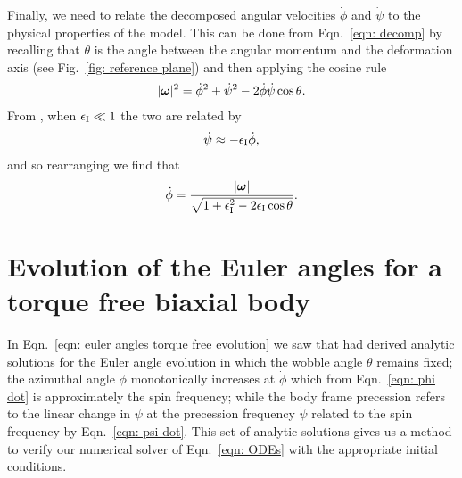 \documentclass[../full_thesis/full_thesis.tex]{subfiles}
\begin{document}
Finally, we need to relate the decomposed angular
velocities $\dot{\phi}$ and $\dot{\psi}$ to the physical properties of the
model.  This can be done from Eqn.~\eqref{eqn: decomp} by recalling that
$\theta$ is the angle between the angular momentum and the deformation axis
(see Fig.~\ref{fig: reference plane}) and then applying the cosine rule
\begin{align}
|\boldsymbol{\omega}|^{2} = \dot{\phi}^{2}+\dot{\psi}^{2} - 2\dot{\phi}\dot{\psi}\cos\theta.
\end{align}
From \citet{Jones2001}, when $\epsilon_{\mathrm{I}} \ll 1$ the two are related by
\begin{align}
\dot{\psi} \approx - \epsilon_{\mathrm{I}} \dot{\phi},
\label{eqn: psi dot}
\end{align}
and so rearranging we find that
\begin{align}
\dot{\phi} = \frac{|\boldsymbol{\omega}|}{\sqrt{1+\epsilon_{\mathrm{I}}^{2} - 2\epsilon_{\mathrm{I}}\cos\theta}}.
\label{eqn: phi dot}
\end{align}

\section{Evolution of the Euler angles for a torque free biaxial body}
\label{sec: biaxial body with no torque}

In Eqn.~\eqref{eqn: euler angles torque free evolution} we saw that
\citet{Jones2001} had derived analytic solutions for the Euler angle evolution
in which the wobble angle $\theta$ remains fixed; the azimuthal angle $\phi$
monotonically increases at $\dot{\phi}$ which from Eqn.~\eqref{eqn: phi dot} is
approximately the spin frequency; while the body frame precession refers to the
linear change in $\psi$ at the precession frequency $\dot{\psi}$ related to the
spin frequency by Eqn.~\eqref{eqn: psi dot}. This set of analytic solutions gives
us a method to verify our numerical solver of Eqn.~\eqref{eqn: ODEs} with the
appropriate initial conditions.
\end{document}
